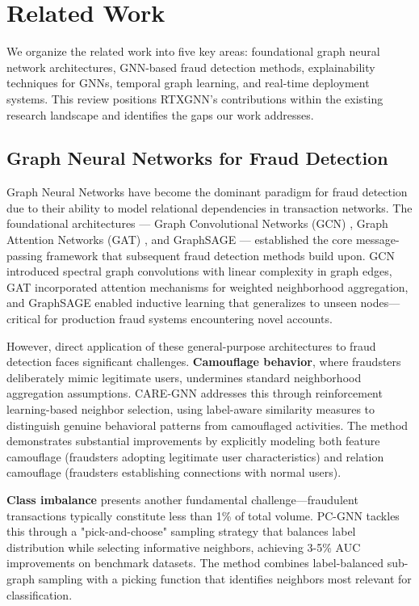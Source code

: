 \section{Related Work} \label{sec:related}

We organize the related work into five key areas: foundational graph neural network architectures, GNN-based fraud detection methods, explainability techniques for GNNs, temporal graph learning, and real-time deployment systems. This review positions RTXGNN's contributions within the existing research landscape and identifies the gaps our work addresses.

\subsection{Graph Neural Networks for Fraud Detection}

Graph Neural Networks have become the dominant paradigm for fraud detection due to their ability to model relational dependencies in transaction networks. The foundational architectures — Graph Convolutional Networks (GCN) \citep{kipf2017gcn, asiri2025graph}, Graph Attention Networks (GAT) \citep{velickovic2018gat,fu2026phishing}, and GraphSAGE \citep{hamilton2017graphsage,tang2025application} — established the core message-passing framework that subsequent fraud detection methods build upon. GCN introduced spectral graph convolutions with linear complexity in graph edges, GAT incorporated attention mechanisms for weighted neighborhood aggregation, and GraphSAGE enabled inductive learning that generalizes to unseen nodes—critical for production fraud systems encountering novel accounts.

However, direct application of these general-purpose architectures to fraud detection faces significant challenges. \textbf{Camouflage behavior}, where fraudsters deliberately mimic legitimate users, undermines standard neighborhood aggregation assumptions. CARE-GNN \citep{dou2020caregnn} addresses this through reinforcement learning-based neighbor selection, using label-aware similarity measures to distinguish genuine behavioral patterns from camouflaged activities. The method demonstrates substantial improvements by explicitly modeling both feature camouflage (fraudsters adopting legitimate user characteristics) and relation camouflage (fraudsters establishing connections with normal users).

\textbf{Class imbalance} presents another fundamental challenge—fraudulent transactions typically constitute less than 1\% of total volume. PC-GNN \citep{liu2021pcgnn} tackles this through a "pick-and-choose" sampling strategy that balances label distribution while selecting informative neighbors, achieving 3-5\% AUC improvements on benchmark datasets. The method combines label-balanced sub-graph sampling with a picking function that identifies neighbors most relevant for classification.

